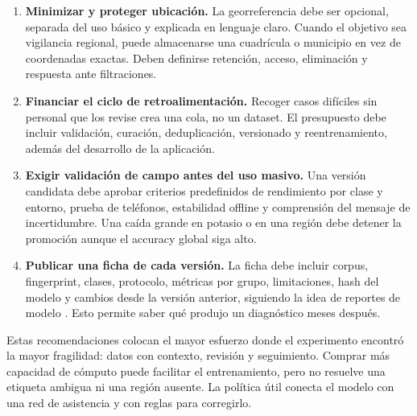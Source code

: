 \begin{enumerate}
  \item \textbf{Minimizar y proteger ubicación.}
  La georreferencia debe ser opcional, separada del uso básico y explicada en
  lenguaje claro. Cuando el objetivo sea vigilancia regional, puede
  almacenarse una cuadrícula o municipio en vez de coordenadas exactas. Deben
  definirse retención, acceso, eliminación y respuesta ante filtraciones.

  \item \textbf{Financiar el ciclo de retroalimentación.}
  Recoger casos difíciles sin personal que los revise crea una cola, no un
  dataset. El presupuesto debe incluir validación, curación, deduplicación,
  versionado y reentrenamiento, además del desarrollo de la aplicación.

  \item \textbf{Exigir validación de campo antes del uso masivo.}
  Una versión candidata debe aprobar criterios predefinidos de rendimiento por
  clase y entorno, prueba de teléfonos, estabilidad offline y comprensión del
  mensaje de incertidumbre. Una caída grande en potasio o en una región debe
  detener la promoción aunque el accuracy global siga alto.

  \item \textbf{Publicar una ficha de cada versión.}
  La ficha debe incluir corpus, fingerprint, clases, protocolo, métricas por
  grupo, limitaciones, hash del modelo y cambios desde la versión anterior,
  siguiendo la idea de reportes de modelo \citep{mitchell2019modelcards}.
  Esto permite saber qué produjo un diagnóstico meses después.
\end{enumerate}

Estas recomendaciones colocan el mayor esfuerzo donde el experimento encontró
la mayor fragilidad: datos con contexto, revisión y seguimiento. Comprar más
capacidad de cómputo puede facilitar el entrenamiento, pero no resuelve una
etiqueta ambigua ni una región ausente. La política útil conecta el modelo con
una red de asistencia y con reglas para corregirlo.
